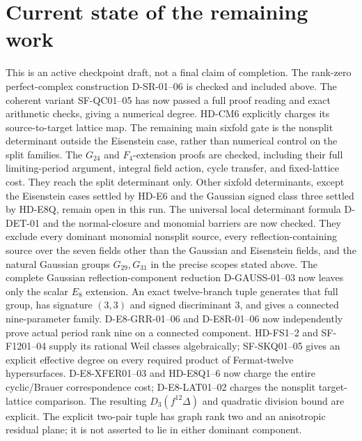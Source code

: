 \documentclass[11pt]{article}
\theoremstyle{remark}\newtheorem{remark}[theorem]{Remark}
\begin{document}
\section{Current state of the remaining work}
This is an active checkpoint draft, not a final claim of completion.
The rank-zero perfect-complex construction D-SR-01--06 is checked and
included above. The coherent variant SF-QC01--05 has now passed a full
proof reading and exact arithmetic checks, giving a numerical degree.
HD-CM6 explicitly charges its source-to-target lattice map. The remaining
main sixfold gate is the nonsplit determinant outside the Eisenstein
case, rather than numerical control on the split families.
The $G_{24}$ and $F_4$-extension proofs are checked, including their full
limiting-period argument, integral field action, cycle transfer, and
fixed-lattice cost. They reach the split determinant only. Other sixfold
determinants, except the Eisenstein cases settled by HD-E6 and the
Gaussian signed class three settled by HD-E8Q, remain open in this
run. The universal local determinant formula D-DET-01 and
the normal-closure and monomial barriers are now checked. They exclude
every dominant monomial nonsplit source, every reflection-containing
source over the seven fields other than the Gaussian and Eisenstein
fields, and the natural Gaussian groups $G_{29},G_{31}$ in the
precise scopes stated above. The complete Gaussian reflection-component
reduction D-GAUSS-01--03 now leaves only the scalar $E_8$ extension.
An exact twelve-branch tuple generates that full group, has signature
$(3,3)$ and signed discriminant $3$, and gives a connected
nine-parameter family. D-E8-GRR-01--06 and D-E8R-01--06 now independently
prove actual period rank nine on a connected component. HD-FS1--2 and
SF-F1201--04 supply its rational Weil classes algebraically; SF-SKQ01--05
gives an explicit effective degree on every required product of
Fermat-twelve hypersurfaces. D-E8-XFER01--03 and HD-E8Q1--6 now
charge the entire cyclic/Brauer correspondence cost; D-E8-LAT01--02
charges the nonsplit target-lattice comparison. The resulting
$D_3(f^{12}\Delta)$ and quadratic division bound are explicit.
The explicit two-pair tuple has graph rank two and an anisotropic
residual plane; it is not asserted to lie in either dominant component.
\end{document}
